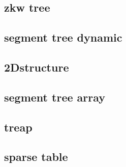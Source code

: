 \subsection{zkw tree}

\subsection{segment tree dynamic}

\subsection{2Dstructure}

\subsection{segment tree array}

\subsection{treap}

\subsection{sparse table}


